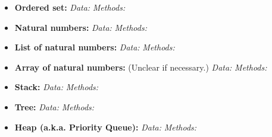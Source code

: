 \documentclass{article}
\begin{document}
\begin{itemize}
  \item \textbf{Ordered set:}
    \emph{Data:}
    \emph{Methods:}

  \item \textbf{Natural numbers:}
    \emph{Data:}
    \emph{Methods:}

  \item \textbf{List of natural numbers:}
    \emph{Data:}
    \emph{Methods:}

  \item \textbf{Array of natural numbers:}
    (Unclear if necessary.)
    \emph{Data:}
    \emph{Methods:}

  \item \textbf{Stack:}
    \emph{Data:}
    \emph{Methods:}

  \item \textbf{Tree:}
    \emph{Data:}
    \emph{Methods:}

  \item \textbf{Heap (a.k.a. Priority Queue):}
    \emph{Data:}
    \emph{Methods:}

\end{itemize}
\end{document}
